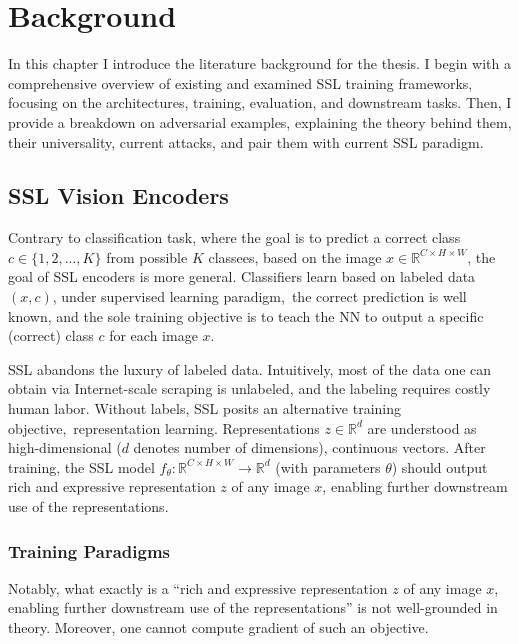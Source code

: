 \chapter{Background}\label{chap:background}


In this chapter I introduce the literature background for the thesis. I begin with a comprehensive overview of existing and examined SSL training frameworks, focusing on the architectures, training, evaluation, and downstream tasks. Then, I provide a breakdown on adversarial examples, explaining the theory behind them, their universality, current attacks, and pair them with current SSL paradigm.

\section{SSL Vision Encoders}\label{sec:ssl_bg}

Contrary to classification task, where the goal is to predict a correct class $c\in\{1, 2,...,K\}$ from possible $K$ classees, based on the image $x\in\mathbb{R}^{C\times H\times W}$, the goal of SSL encoders is more general. Classifiers learn based on labeled data $(x, c)$, under supervised learning paradigm,~\ie the correct prediction is well known, and the sole training objective is to teach the NN to output a specific (correct) class $c$ for each image $x$.

SSL abandons the luxury of labeled data. Intuitively, most of the data one can obtain via Internet-scale scraping is unlabeled, and the labeling requires costly human labor. Without labels, SSL posits an alternative training objective,~\ie representation learning. Representations $z\in\mathbb{R}^d$ are understood as high-dimensional ($d$ denotes number of dimensions), continuous vectors. After training, the SSL model $f_\theta: \mathbb{R}^{C\times H\times W}\rightarrow\mathbb{R}^d$ (with parameters $\theta$) should output rich and expressive representation $z$ of any image $x$, enabling further downstream use of the representations.

\subsection{Training Paradigms}\label{sec:ssl_training}

Notably, what exactly is a ``rich and expressive representation $z$ of any image $x$, enabling further downstream use of the representations'' is not well-grounded in theory. Moreover, one cannot compute gradient of such an objective. 

